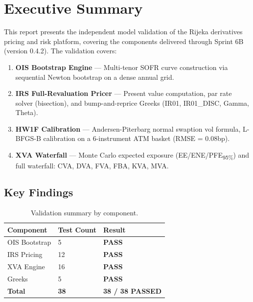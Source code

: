 \documentclass[11pt,a4paper]{article}
\newcommand{\pass}{\textbf{\color{passteal}PASS}}
\begin{document}
\tableofcontents
\newpage

\section{Executive Summary}

This report presents the independent model validation of the Rijeka derivatives
pricing and risk platform, covering the components delivered through Sprint 6B
(version 0.4.2). The validation covers:

\begin{enumerate}[leftmargin=2em]
  \item \textbf{OIS Bootstrap Engine} --- Multi-tenor SOFR curve construction via
        sequential Newton bootstrap on a dense annual grid.
  \item \textbf{IRS Full-Revaluation Pricer} --- Present value computation, par rate
        solver (bisection), and bump-and-reprice Greeks (IR01, IR01\_DISC, Gamma, Theta).
  \item \textbf{HW1F Calibration} --- Andersen-Piterbarg normal swaption vol formula,
        L-BFGS-B calibration on a 6-instrument ATM basket (RMSE = 0.08bp).
  \item \textbf{XVA Waterfall} --- Monte Carlo expected exposure (EE/ENE/PFE\textsubscript{95\%})
        and full waterfall: CVA, DVA, FVA, FBA, KVA, MVA.
\end{enumerate}

\subsection*{Key Findings}

\begin{table}[H]
\centering
\begin{tabular}{lll}
\toprule
\textbf{Component} & \textbf{Test Count} & \textbf{Result} \\
\midrule
OIS Bootstrap     & 5  & \pass \\
IRS Pricing       & 12 & \pass \\
XVA Engine        & 16 & \pass \\
Greeks            & 5  & \pass \\
\midrule
\textbf{Total}    & \textbf{38} & \textbf{\color{passteal}38 / 38 PASSED} \\
\bottomrule
\end{tabular}
\caption{Validation summary by component.}
\end{table}
\end{document}
